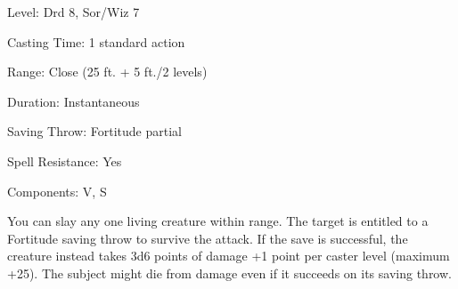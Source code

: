 
\begin{description*}
\item[Level:] Drd 8, Sor/Wiz 7
\item[Casting Time:] 1 standard action
\item[Range:] Close (25 ft. + 5 ft./2 levels)
\item[Duration:] Instantaneous
\item[Saving Throw:] Fortitude partial
\item[Spell Resistance:] Yes
\item[Components:] V, S
\end{description*}

You can slay any one living creature within range. The target is entitled to a
Fortitude saving throw to survive the attack. If the save is successful, the creature
instead takes 3d6 points of damage +1 point per caster level (maximum +25).
The subject might die from damage even if it succeeds on its saving throw.